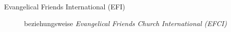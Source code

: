 \begin{description}
 \item[Evangelical Friends International (EFI)] beziehungsweise \textit{Evangelical Friends Church International (EFCI)}

 \end{description}

\normalsize
